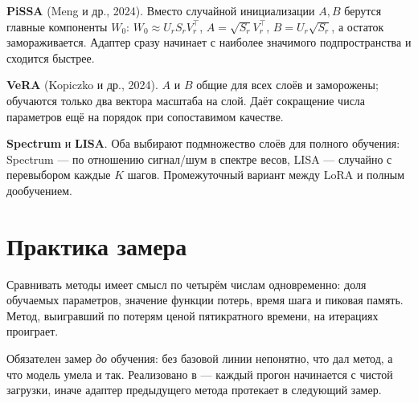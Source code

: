 \documentclass[11pt,a4paper]{article}
\begin{document}
\textbf{PiSSA} (Meng и др., 2024). Вместо случайной инициализации
$A,B$ берутся главные компоненты $W_0$: $W_0 \approx U_r S_r V_r^\top$,
$A = \sqrt{S_r}V_r^\top$, $B = U_r\sqrt{S_r}$, а остаток замораживается.
Адаптер сразу начинает с наиболее значимого подпространства
и сходится быстрее.

\textbf{VeRA} (Kopiczko и др., 2024). $A$ и $B$ общие для всех слоёв
и заморожены; обучаются только два вектора масштаба на слой. Даёт
сокращение числа параметров ещё на порядок при сопоставимом качестве.

\textbf{Spectrum} и \textbf{LISA}. Оба выбирают подмножество слоёв для
полного обучения: Spectrum — по отношению сигнал/шум в спектре весов,
LISA — случайно с перевыбором каждые $K$ шагов. Промежуточный вариант
между LoRA и полным дообучением.

\section{Практика замера}

Сравнивать методы имеет смысл по четырём числам одновременно: доля
обучаемых параметров, значение функции потерь, время шага и пиковая
память. Метод, выигравший по потерям ценой пятикратного времени,
на итерациях проиграет.

Обязателен замер \emph{до} обучения: без базовой линии непонятно, что
дал метод, а что модель умела и так. Реализовано в
 — каждый прогон начинается с чистой загрузки,
иначе адаптер предыдущего метода протекает в следующий замер.
\end{document}
